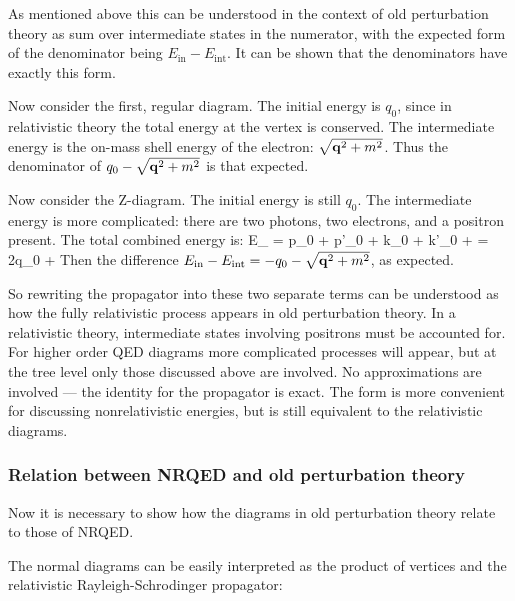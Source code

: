 As mentioned above this can be understood in the context of old perturbation theory as sum over intermediate states in the numerator,  with the expected form of the denominator being $E_\text{in} - E_\text{int}$.  It can be shown that the denominators have exactly this form. 

Now consider the first, regular diagram.  The initial energy is $q_0$, since in relativistic theory the total energy at the vertex is conserved.  The intermediate energy is the on-mass shell energy of the electron: $\sqrt{\mathbf{q}^2+ m^2}$.  Thus the denominator of $q_0 - \sqrt{\mathbf{q}^2+ m^2}$ is that expected.

Now consider the Z-diagram.  The initial energy is still $q_0$.  The intermediate energy is more complicated: there are two photons, two electrons, and a positron present.  The total combined energy is:
\beq
	E_ = p_0 + p'_0 + k_0 + k'_0 +  = 2q_0 +  
\eeq
Then the difference $E_\text{in} - E_\text{int} = -q_0 - \sqrt{\mathbf{q}^2 + m^2}$, as expected.

So rewriting the propagator into these two separate terms can be understood as how the fully relativistic process appears in old perturbation theory.  In a relativistic theory, intermediate states involving positrons must be accounted for.  For higher order QED diagrams more complicated processes will appear, but at the tree level only those discussed above are involved.  No approximations are involved --- the identity for the propagator is exact.  The form is more convenient for discussing nonrelativistic energies, but is still equivalent to the relativistic diagrams.






\subsubsection{Relation between NRQED and old perturbation theory}
Now it is necessary to show how the diagrams in old perturbation theory relate to those of NRQED.  

The normal diagrams can be easily interpreted as the product of vertices and the relativistic Rayleigh-Schrodinger propagator:


